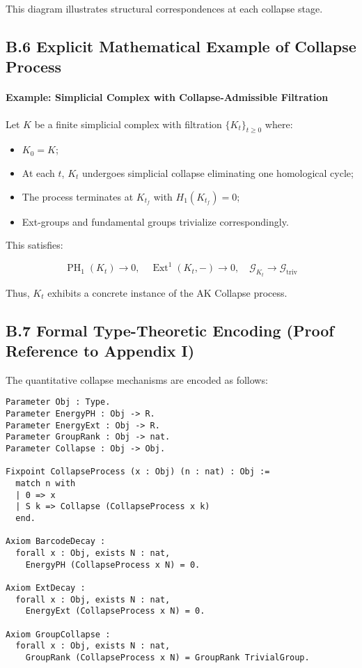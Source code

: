 \documentclass[11pt]{article}
\DeclareMathOperator{\Ext}{Ext}
\DeclareMathOperator{\PH}{PH}
\begin{document}
This diagram illustrates structural correspondences at each collapse stage.

\subsection*{B.6 Explicit Mathematical Example of Collapse Process}

\paragraph{Example: Simplicial Complex with Collapse-Admissible Filtration}

Let $K$ be a finite simplicial complex with filtration $\{K_t\}_{t \geq 0}$ where:

\begin{itemize}
    \item $K_0 = K$;
    \item At each $t$, $K_t$ undergoes simplicial collapse eliminating one homological cycle;
    \item The process terminates at $K_{t_f}$ with $H_1(K_{t_f}) = 0$;
    \item Ext-groups and fundamental groups trivialize correspondingly.
\end{itemize}

This satisfies:

\[
\PH_1(K_t) \to 0, \quad \Ext^1(K_t, -) \to 0, \quad \mathcal{G}_{K_t} \to \mathcal{G}_{\mathrm{triv}}
\]

Thus, $K_t$ exhibits a concrete instance of the AK Collapse process.

\subsection*{B.7 Formal Type-Theoretic Encoding (Proof Reference to Appendix I)}

The quantitative collapse mechanisms are encoded as follows:

\begin{lstlisting}[language=Coq, caption=Quantitative Collapse Encoding]
Parameter Obj : Type.
Parameter EnergyPH : Obj -> R.
Parameter EnergyExt : Obj -> R.
Parameter GroupRank : Obj -> nat.
Parameter Collapse : Obj -> Obj.

Fixpoint CollapseProcess (x : Obj) (n : nat) : Obj :=
  match n with
  | 0 => x
  | S k => Collapse (CollapseProcess x k)
  end.

Axiom BarcodeDecay :
  forall x : Obj, exists N : nat,
    EnergyPH (CollapseProcess x N) = 0.

Axiom ExtDecay :
  forall x : Obj, exists N : nat,
    EnergyExt (CollapseProcess x N) = 0.

Axiom GroupCollapse :
  forall x : Obj, exists N : nat,
    GroupRank (CollapseProcess x N) = GroupRank TrivialGroup.
\end{lstlisting}
\end{document}
